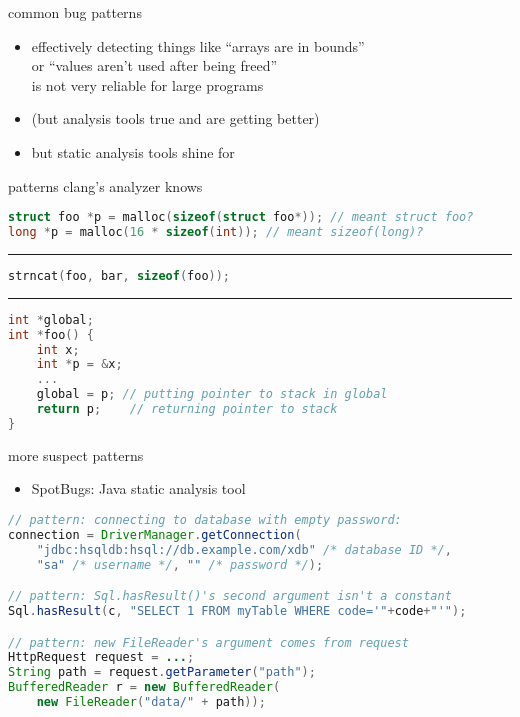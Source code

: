 \begin{frame}{common bug patterns}
    \begin{itemize}
    \item effectively detecting things like ``arrays are in bounds'' \\
        or ``values aren't used after being freed'' \\
        is not very reliable for large programs
    \item (but analysis tools true and are getting better)
    \vspace{.5cm}
    \item but static analysis tools shine for 
    \end{itemize}
\end{frame}

\begin{frame}[fragile,label=suspectPatterns]{patterns clang's analyzer knows}
\begin{lstlisting}[language=C,style=smaller]
struct foo *p = malloc(sizeof(struct foo*)); // meant struct foo?
long *p = malloc(16 * sizeof(int)); // meant sizeof(long)?
\end{lstlisting}
\hrule
\begin{lstlisting}[language=C,style=smaller]
strncat(foo, bar, sizeof(foo));
\end{lstlisting}
\hrule
\begin{lstlisting}[language=C,style=smaller]
int *global;
int *foo() {
    int x;
    int *p = &x;
    ...
    global = p; // putting pointer to stack in global
    return p;    // returning pointer to stack
}
\end{lstlisting}
\end{frame}

\begin{frame}[fragile,label=suspectPatterns]{more suspect patterns }
    \begin{itemize}
    \item SpotBugs: Java static analysis tool
    \end{itemize}
\begin{lstlisting}[language=Java,style=smaller]
// pattern: connecting to database with empty password:
connection = DriverManager.getConnection(
    "jdbc:hsqldb:hsql://db.example.com/xdb" /* database ID */, 
    "sa" /* username */, "" /* password */);

// pattern: Sql.hasResult()'s second argument isn't a constant
Sql.hasResult(c, "SELECT 1 FROM myTable WHERE code='"+code+"'");

// pattern: new FileReader's argument comes from request
HttpRequest request = ...;
String path = request.getParameter("path");
BufferedReader r = new BufferedReader(
    new FileReader("data/" + path));
\end{lstlisting}
\end{frame}
